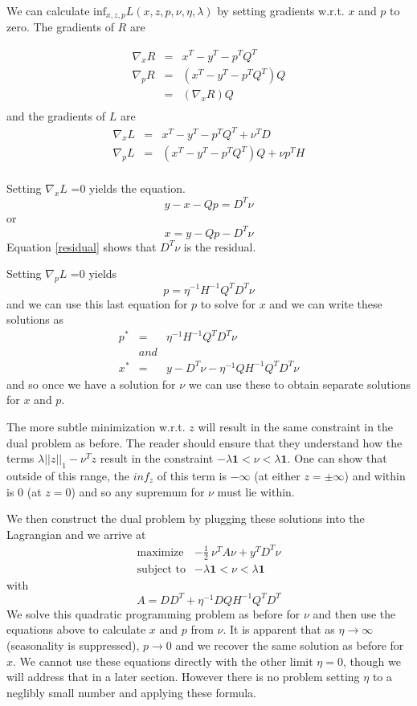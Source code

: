 \documentclass{article}
\begin{document}
We can calculate $\mbox{inf}_{x,z,p} L(x,z,p,\nu,\eta,\lambda)$ by setting gradients w.r.t. $x$ and $p$ to zero. The
gradients of $R$ are

\begin{eqnarray}
\nabla_x R &  =  &  x^T - y^T - p^T Q^T\\
\nabla_p R &  =  &  \left( x^T - y^T - p^T Q^T \right) Q \\
& = & \left(\nabla_x R \right) Q \\
\end{eqnarray}
and the gradients of $L$ are
\begin{eqnarray}
\nabla_x L &  =  &  x^T - y^T - p^T Q^T + \nu^T D\\
\nabla_p L &  =  &  \left( x^T - y^T - p^T Q^T \right) Q + \nu p^T H \\
\end{eqnarray}


Setting $\nabla_x L$ =0 yields the equation.
\[
y - x - Qp = D^T \nu \label{residual}
\] or
\[
x = y - Qp - D^T \nu
\]
Equation \ref{residual} shows that $D^T \nu$ is the residual.

Setting $\nabla_p L$ =0 yields
\[
p = \eta^{-1} H^{-1} Q^T D^T \nu
\]
and we can use this last equation for $p$ to solve for $x$ and we can write these solutions as
\begin{eqnarray}
p^* & = &  \eta^{-1} H^{-1} Q^T D^T \nu \\
& and & \nonumber \\
x^* & = & y - D^T \nu - \eta^{-1} Q H^{-1} Q^T D^T \nu
\end{eqnarray}
and so once we have a solution for $\nu$ we can use these to obtain separate
solutions for $x$ and $p$.

The more subtle minimization w.r.t. $z$ will result in the same constraint in the dual problem as before. The reader
should ensure that they understand how the terms $\lambda ||z||_1 - \nu^T z$ result in the constraint
$- \lambda \mathbf{1} < \nu < \lambda \mathbf{1}$. One can show that outside of this range, the $inf_z$ of this term
is $-\infty$ (at either $z = \pm \infty$) and within is 0 (at $z=0$) and so any supremum for $\nu$
must lie within.

We then construct the dual problem by plugging these solutions into the Lagrangian and we arrive at
\begin{eqnarray}
\mbox{maximize} & -\frac{1}{2} ~ \nu^T A \nu + y^T D^T \nu \\
\mbox{subject to} & - \lambda \mathbf{1} < \nu < \lambda \mathbf{1}
\end{eqnarray}
with
\[
A = D D^T + \eta^{-1} D Q H^{-1} Q^T D^T
\]
We solve this quadratic programming problem as before for $\nu$ and then use the equations above
to calculate $x$ and $p$ from $\nu$. It is apparent that as $\eta \rightarrow \infty$ (seasonality is suppressed),
$p \rightarrow 0$ and we recover the same solution as before for $x$. We cannot use these equations directly with
the other limit $\eta = 0$, though we will address that in a later section. However there is no problem setting
$\eta$ to a neglibly small number and applying these formula.
\end{document}

